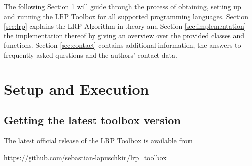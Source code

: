 \documentclass[a4wide]{article}
\begin{document}
The following Section \ref{sec:setup} will guide through the process of obtaining, setting up and running the LRP Toolbox for all supported programming languages. Section \ref{sec:lrp} explains the LRP Algorithm in theory and Section \ref{sec:implementation} the implementation thereof by giving an overview over the provided classes and functions. Section \ref{sec:contact} contains additional information, the answers to frequently asked questions and the authors' contact data.



\section{Setup and Execution}
\label{sec:setup}

\subsection*{Getting the latest toolbox version}
The latest official release of the LRP Toolbox is available from
\begin{center}
	\url{https://github.com/sebastian-lapuschkin/lrp_toolbox}
\end{center}
\end{document}
